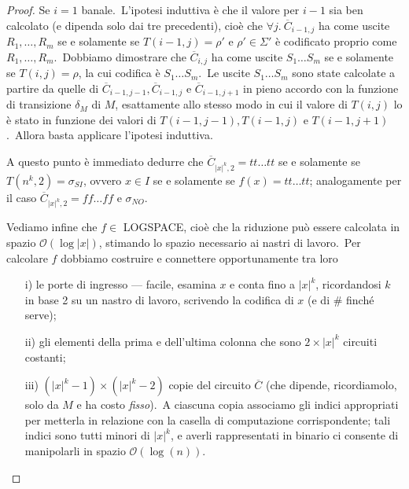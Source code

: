 \begin{proof}
    Se $i = 1$ banale.\
    L'ipotesi induttiva è che il valore per $i-1$ sia ben calcolato (e dipenda solo dai tre precedenti), cioè che $\forall j.\ \overline{C}_{i-1,j}$ ha come uscite $R_1,\dots, R_m$ se e solamente se $T(i-1,j) = \rho'$ e $\rho' \in \Sigma'$ è codificato proprio come $R_1,\dots, R_m$.\
    Dobbiamo dimostrare che $\overline{C}_{i,j}$ ha come uscite $S_1 \dots S_m$ se e solamente se $T(i,j) = \rho$, la cui codifica è $S_1 \dots S_m$.\
    Le uscite $S_1 \dots S_m$ sono state calcolate a partire da quelle di $\overline{C}_{i-1,j-1},\overline{C}_{i-1,j}$ e $\overline{C}_{i-1,j+1}$ in pieno accordo con la funzione di transizione $\delta_M$ di $M$, esattamente allo stesso modo in cui il valore di $T(i,j)$ lo è stato in funzione dei valori di $T(i-1,j-1),T(i-1,j)$ e $T(i-1,j+1)$.\
    Allora basta applicare l'ipotesi induttiva.\

    A questo punto è immediato dedurre che $\overline{C}_{|x|^k,2} = \mathit{tt}\dots \mathit{tt}$ se e solamente se $T(n^k, 2) = \sigma_{SI}$, ovvero $x \in I$ se e solamente se $f(x) = \mathit{tt}\dots\mathit{tt}$; analogamente per il caso $\overline{C}_{|x|^k, 2} = \mathit{ff}\dots\mathit{ff}$ e $\sigma_{NO}$.

    \medskip
    \noindent Vediamo infine che $f \in$ LOGSPACE, cioè che la riduzione può essere calcolata in spazio $\mathcal{O}(\log|x|)$, stimando lo spazio necessario ai nastri di lavoro.\
    Per calcolare $f$ dobbiamo costruire e connettere opportunamente tra loro
    \begin{itemize}
        \item[i)] le porte di ingresso --- facile, esamina $x$ e conta fino a $|x|^k$, ricordandosi $k$ in base 2 su un nastro di lavoro, scrivendo la codifica di $x$ (e di \# finché serve);
        \item[ii)] gli elementi della prima e dell'ultima colonna che sono $2 \times |x|^k$ circuiti costanti;
        \item[iii)] $\left(|x|^k - 1\right) \times \left(|x|^k - 2\right)$ copie del circuito $\overline{C}$ (che dipende, ricordiamolo, solo da $M$ e ha costo \textit{fisso}).\ A ciascuna copia associamo gli indici appropriati per metterla in relazione con la casella di computazione corrispondente; tali indici sono tutti minori di $|x|^k$, e averli rappresentati in binario ci consente di manipolarli in spazio $\mathcal{O}(\log(n))$.
    \end{itemize}

\end{proof}

